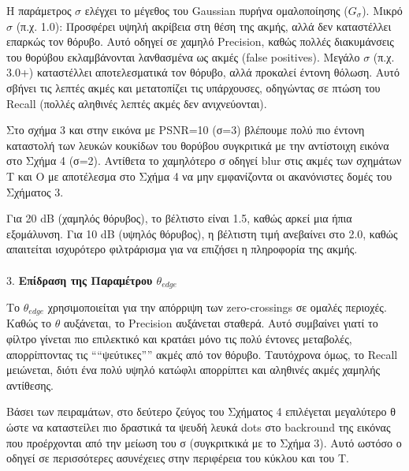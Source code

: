 \documentclass[12pt,a4paper]{article}
\begin{document}
Η παράμετρος $\sigma$ ελέγχει το μέγεθος του \foreignlanguage{english}{Gaussian} πυρήνα ομαλοποίησης ($G_{\sigma}$). Μικρό $\sigma$ (π.χ. 1.0): Προσφέρει υψηλή ακρίβεια στη θέση της ακμής, αλλά δεν καταστέλλει επαρκώς τον θόρυβο. Αυτό οδηγεί σε χαμηλό \foreignlanguage{english}{Precision}, καθώς πολλές διακυμάνσεις του θορύβου εκλαμβάνονται λανθασμένα ως ακμές (\foreignlanguage{english}{false positives}). Μεγάλο $\sigma$ (π.χ. 3.0+) καταστέλλει αποτελεσματικά τον θόρυβο, αλλά προκαλεί έντονη θόλωση. Αυτό σβήνει τις λεπτές ακμές και μετατοπίζει τις υπάρχουσες, οδηγώντας σε πτώση του \foreignlanguage{english}{Recall} (πολλές αληθινές λεπτές ακμές δεν ανιχνεύονται). 

Στο σχήμα 3 και στην εικόνα με \foreignlanguage{english}{PSNR}=10 (σ=3) βλέπουμε πολύ πιο έντονη καταστολή των λευκών κουκίδων του θορύβου συγκριτικά με την αντίστοιχη εικόνα στο Σχήμα 4 (σ=2). Αντίθετα το χαμηλότερο σ οδηγεί \foreignlanguage{english}{blur} στις ακμές των σχημάτων Τ και Ο με αποτέλεσμα στο Σχήμα 4 να μην εμφανίζοντα οι ακανόνιστες δομές του Σχήματος 3. 

Για 20 \foreignlanguage{english}{dB} (χαμηλός θόρυβος), το βέλτιστο είναι 1.5, καθώς αρκεί μια ήπια εξομάλυνση. Για 10 \foreignlanguage{english}{dB} (υψηλός θόρυβος), η βέλτιστη τιμή ανεβαίνει στο 2.0, καθώς απαιτείται ισχυρότερο φιλτράρισμα για να επιζήσει η πληροφορία της ακμής.
\\
\\
3. \textbf{Επίδραση της Παραμέτρου $\theta_{edge}$}

Το $\theta_{edge}$ χρησιμοποιείται για την απόρριψη των \foreignlanguage{english}{zero-crossings} σε ομαλές περιοχές. Καθώς το $\theta$ αυξάνεται, το \foreignlanguage{english}{Precision} αυξάνεται σταθερά. Αυτό συμβαίνει γιατί το φίλτρο γίνεται πιο επιλεκτικό και κρατάει μόνο τις πολύ έντονες μεταβολές, απορρίπτοντας τις ````ψεύτικες'''' ακμές από τον θόρυβο. Ταυτόχρονα όμως, το \foreignlanguage{english}{Recall} μειώνεται, διότι ένα πολύ υψηλό κατώφλι απορρίπτει και αληθινές ακμές χαμηλής αντίθεσης. 

Βάσει των πειραμάτων, στο δεύτερο ζεύγος του Σχήματος 4 επιλέγεται μεγαλύτερο θ ώστε να καταστείλει πιο δραστικά τα ψευδή λευκά  \foreignlanguage{english}{dots} στο  \foreignlanguage{english}{backround} της εικόνας που προέρχονται από την μείωση του σ (συγκριτκικά με το Σχήμα 3). Αυτό ωστόσο ο οδηγεί σε περισσότερες ασυνέχειες στην περιφέρεια του κύκλου και του Τ. 
\end{document}
